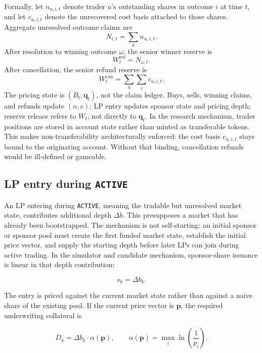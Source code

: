 \documentclass[10pt]{article}
\begin{document}
Formally, let $n_{u,i,t}$ denote trader $u$'s outstanding shares in outcome $i$ at time $t$, and let $c_{u,i,t}$ denote the unrecovered cost basis attached to those shares. Aggregate unresolved outcome claims are
\[
N_{i,t} = \sum_u n_{u,i,t}.
\]
After resolution to winning outcome $\omega$, the senior winner reserve is
\[
W_t^{\mathrm{res}} = N_{\omega,t}.
\]
After cancellation, the senior refund reserve is
\[
W_t^{\mathrm{can}} = \sum_u \sum_i c_{u,i,t}.
\]
The pricing state is $(B_t,\mathbf{q}_t)$, not the claim ledger. Buys, sells, winning claims, and refunds update $(n,c)$; LP entry updates sponsor state and pricing depth; reserve release refers to $W_t$, not directly to $\mathbf{q}_t$. In the research mechanism, trader positions are stored in account state rather than minted as transferable tokens. This makes non-transferability architecturally enforced: the cost basis $c_{u,i,t}$ stays bound to the originating account. Without that binding, cancellation refunds would be ill-defined or gameable.

\subsection{LP entry during \texttt{ACTIVE}}

An LP entering during \texttt{ACTIVE}, meaning the tradable but unresolved market state, contributes additional depth $\Delta b$. This presupposes a market that has already been bootstrapped. The mechanism is not self-starting: an initial sponsor or sponsor pool must create the first funded market state, establish the initial price vector, and supply the starting depth before later LPs can join during active trading. In the simulator and candidate mechanism, sponsor-share issuance is linear in that depth contribution:

\[
s_k = \Delta b_k.
\]

The entry is priced against the current market state rather than against a naive share of the existing pool. If the current price vector is $\mathbf{p}$, the required underwriting collateral is

\[
D_k = \Delta b_k \cdot \alpha(\mathbf{p}), \qquad \alpha(\mathbf{p}) = \max_i \ln \left(\frac{1}{p_i}\right).
\]

\begin{center}
\setlength{\fboxsep}{8pt}
\end{center}
\end{document}
